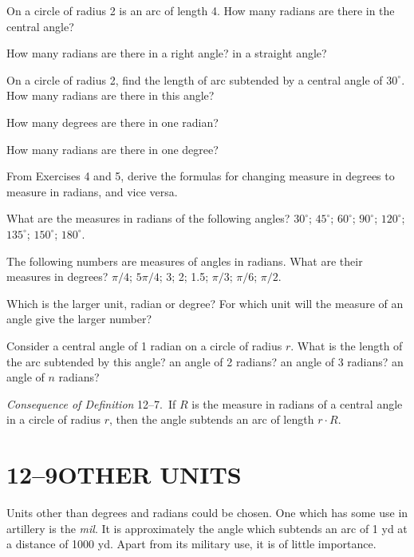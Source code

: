 \documentclass[11pt]{book}
\begin{document}
\begin{exercisecols}
\begin{exlist}
\item On a circle of radius 2 is an arc of length 4. How many radians are there
      in the central angle?
\item How many radians are there in a right angle? in a straight angle?
\item On a circle of radius 2, find the length of arc subtended by a central
      angle of $30^\circ$. How many radians are there in this angle?
\item How many degrees are there in one radian?
\item How many radians are there in one degree?
\item From Exercises 4 and 5, derive the formulas for changing measure in
      degrees to measure in radians, and vice versa.
\item What are the measures in radians of the following angles? $30^\circ$;
      $45^\circ$; $60^\circ$; $90^\circ$; $120^\circ$; $135^\circ$;
      $150^\circ$; $180^\circ$.
\item The following numbers are measures of angles in radians. What are their
      measures in degrees? $\pi/4$; $5\pi/4$; 3; 2; 1.5; $\pi/3$; $\pi/6$;
      $\pi/2$.
\item Which is the larger unit, radian or degree? For which unit will the
      measure of an angle give the larger number?
\item Consider a central angle of 1 radian on a circle of radius $r$. What is
      the length of the arc subtended by this angle? an angle of 2 radians? an
      angle of 3 radians? an angle of $n$ radians?
\end{exlist}
\end{exercisecols}

\par\medskip\noindent\emph{Consequence of Definition} 12--7.\ If $R$ is the
measure in radians of a central angle in a circle of radius $r$, then the angle
subtends an arc of length $r \cdot R$.\par\medskip

\section*{12--9\quad OTHER UNITS}

Units other than degrees and radians could be chosen. One which has some use in
artillery is the \emph{mil}. It is approximately the angle which subtends an arc
of 1 yd at a distance of 1000 yd. Apart from its military use, it is of little
importance.
\end{document}
